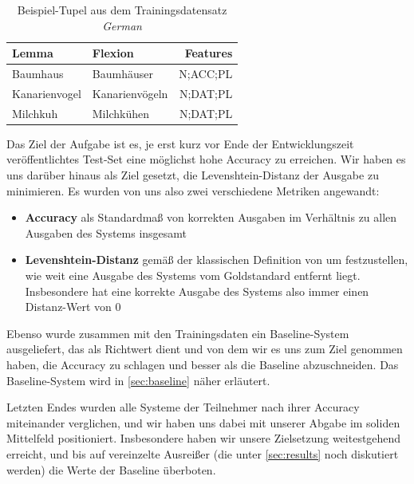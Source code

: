 \documentclass[a4paper]{article}
\newcommand{\lang}[1]{\textit{#1}}
\begin{document}
\begin{table}[htb]
\centering
\begin{tabular}{llr}
\toprule
Lemma & Flexion & Features\\
\midrule
Baumhaus & Baumhäuser & N;ACC;PL\\
Kanarienvogel & Kanarienvögeln & N;DAT;PL\\
Milchkuh & Milchkühen & N;DAT;PL\\
\bottomrule
\end{tabular}
\caption{Beispiel-Tupel aus dem Trainingsdatensatz \lang{German}}
\label{fig:german-declension}
\end{table}

Das Ziel der Aufgabe ist es, je %
erst kurz vor Ende der Entwicklungszeit veröffentlichtes Test-Set eine möglichst hohe Accuracy zu erreichen. Wir haben es uns darüber hinaus als Ziel gesetzt, die Levenshtein-Distanz der Ausgabe zu minimieren. Es wurden von uns also zwei verschiedene Metriken angewandt:
\begin{itemize}
    \item \textbf{Accuracy} als Standardmaß von korrekten Ausgaben im Verhältnis zu allen Ausgaben des Systems insgesamt
    \item \textbf{Levenshtein-Distanz} gemäß der klassischen Definition von \citet{levenshtein:binary66} um festzustellen, wie weit eine Ausgabe des Systems vom Goldstandard entfernt liegt. Insbesondere hat eine korrekte Ausgabe des Systems also immer einen Distanz-Wert von $0$
\end{itemize}
Ebenso wurde zusammen mit den Trainingsdaten ein Baseline-System ausgeliefert, das als Richtwert dient und von dem wir es uns zum Ziel genommen haben, die Accuracy zu schlagen und besser als die Baseline abzuschneiden.
Das Baseline-System wird in \autoref{sec:baseline} näher erläutert.

Letzten Endes wurden alle Systeme der Teilnehmer nach ihrer Accuracy miteinander verglichen, und wir haben uns dabei mit unserer Abgabe im soliden Mittelfeld positioniert. Insbesondere haben wir unsere Zielsetzung weitestgehend erreicht, und bis auf vereinzelte Ausreißer (die unter \autoref{sec:results} noch diskutiert werden) die Werte der Baseline überboten.
\end{document}
